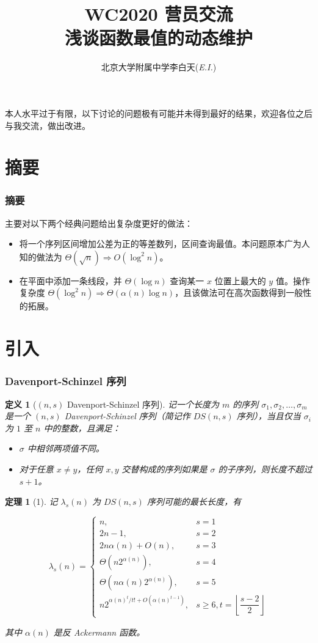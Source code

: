 \documentclass[mathserif]{ctexbeamer}
\title{WC2020 营员交流\\
浅谈函数最值的动态维护}
\author{北京大学附属中学\quad 李白天(\emph{E.I.})}
\date{}
\newtheorem{Def}{定义}
\newtheorem{Thm}{定理}
\begin{document}
\frame{\titlepage}
\section{}
\frame
{
  本人水平过于有限，以下讨论的问题极有可能并未得到最好的结果，欢迎各位之后与我交流，做出改进。
}

\section{摘要}
\frame
{
  \frametitle{摘要}

  主要对以下两个经典问题给出复杂度更好的做法：
  
  \begin{itemize}
  \item 将一个序列区间增加公差为正的等差数列，区间查询最值。本问题原本广为人知的做法为 $\Theta(\sqrt n) \Rightarrow O(\log^2 n)$。
  \item 在平面中添加一条线段，并 $\Theta(\log n)$ 查询某一 $x$ 位置上最大的 $y$ 值。操作复杂度 $\Theta(\log^2 n) \Rightarrow \Theta(\alpha(n)\log n)$，且该做法可在高次函数得到一般性的拓展。
  \end{itemize}
}

\section{引入}
\frame
{
  \frametitle{Davenport-Schinzel 序列}
  
  \begin{Def}[$(n, s)$ Davenport-Schinzel 序列]
  记一个长度为 $m$ 的序列 $\sigma_1, \sigma_2, \dots, \sigma_m$ 是一个 $(n, s)$ Davenport-Schinzel 序列（简记作 $DS(n, s)$ 序列），当且仅当 $\sigma_i$ 为 $1$ 至 $n$ 中的整数，且满足：
\begin{itemize}
\item $\sigma$ 中相邻两项值不同。
\item 对于任意 $x\neq y$，任何 $x, y$ 交替构成的序列如果是 $\sigma$ 的子序列，则长度不超过 $s+1$。
\end{itemize}
  \end{Def}
}

\frame
{
  \begin{Thm}[1]
  
  记 $\lambda_s(n)$ 为 $DS(n, s)$ 序列可能的最长长度，有\cite{ds}

$$
\lambda_s(n) = \begin{cases}
n, & s = 1 \\
2n - 1, & s = 2\\
2n\alpha(n) + O(n), & s = 3\\
\Theta(n 2^{\alpha(n)}), & s = 4\\
\Theta(n\alpha(n) 2^{\alpha(n)}), & s = 5\\
n2^{\alpha(n)^t/t! + O(\alpha(n)^{t-1})}, & s\ge 6, t = \left\lfloor \dfrac {s-2}2\right \rfloor
\end{cases}
$$

其中 $\alpha(n)$ 是反 Ackermann 函数。


  \end{Thm}
}
\end{document}
